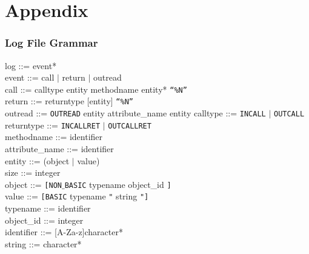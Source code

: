 \chapter{Appendix}

\subsection{Log File Grammar}
\label{sec:log_file_grammar}
log ::= event* \\
event ::= call $\mid$ return $\mid$ outread\\
call ::= calltype entity methodname entity* \texttt{“\%N”} \\
return ::= returntype [entity]  \texttt{“\%N”}\\
outread ::= \texttt{OUTREAD} entity attribute\_name entity
calltype ::= \texttt{INCALL} $\mid$ \texttt{OUTCALL} \\
returntype ::= \texttt{INCALLRET} $\mid$ \texttt{OUTCALLRET} \\
methodname ::= identifier \\
attribute\_name ::= identifier \\
entity ::= (object $\mid$ value) \\
size ::= integer \\
object ::= \texttt{[NON$\_$BASIC} typename object\_id \texttt{]} \\
value ::= \texttt{[BASIC} typename \texttt{"} string \texttt{"]} \\
typename ::= identifier \\
object\_id ::= integer\\
identifier ::= [A-Za-z]character*\\
string ::= character*\\

